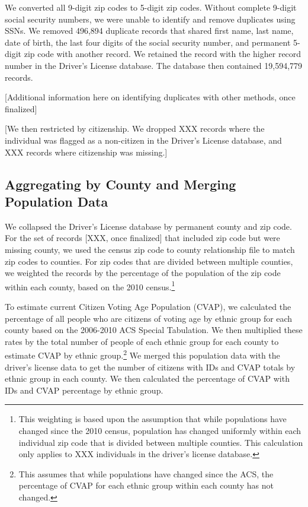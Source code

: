 \documentclass[12pt]{article}
\begin{document}
We converted all 9-digit zip codes to 5-digit zip codes.  Without complete 9-digit social security numbers, we were unable to identify and remove duplicates using SSNs.  We removed 496,894 duplicate records that shared first name, last name, date of birth, the last four digits of the social security number, and permanent 5-digit zip code with another record.  We retained the record with the higher record number in the Driver's License database.  The database then contained 19,594,779 records.

[Additional information here on identifying duplicates with other methods, once finalized]

[We then restricted by citizenship.  We dropped XXX records where the individual was flagged as a non-citizen in the Driver's License database, and XXX records where citizenship was missing.] 

\subsection{Aggregating by County and Merging Population Data}
We collapsed the Driver's License database by permanent county and zip
code.  For the set of records [XXX, once finalized] that included zip
code but were missing county, we used the census zip code to county
relationship file to match zip codes to counties.  For zip codes that
are divided between multiple counties, we weighted the records by the
percentage of the population of the zip code within each county, based
on the 2010 census.\footnote{This weighting is based upon the
  assumption that while populations have changed since the 2010
  census, population has changed uniformly within each individual zip
  code that is divided between multiple counties.  This calculation
  only applies to XXX individuals in the driver's license database.}

To estimate current Citizen Voting Age Population (CVAP), we
calculated the percentage of all people who are citizens of voting age
by ethnic group for each county based on the 2006-2010 ACS Special
Tabulation.  We then multiplied these rates by the total number of
people of each ethnic group for each county to estimate CVAP by ethnic
group.\footnote{This assumes that while populations have changed since
  the ACS, the percentage of CVAP for each ethnic group within each
  county has not changed.}  We merged this population data with the
driver's license data to get the number of citizens with IDs and CVAP
totals by ethnic group in each county.  We then calculated the
percentage of CVAP with IDs and CVAP percentage by ethnic group.
\end{document}
